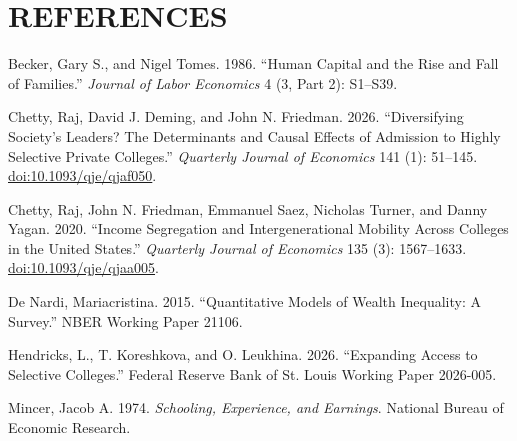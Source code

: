 \documentclass[12pt,letterpaper]{article}
\begin{document}
\section*{REFERENCES}
\begin{list}{}{\setlength{\leftmargin}{0.3in}
              \setlength{\itemindent}{-0.3in}
              \setlength{\itemsep}{0.6\baselineskip}
              \setlength{\parsep}{0pt}}
\item Becker, Gary S., and Nigel Tomes. 1986. ``Human Capital and the Rise and Fall of Families.'' \textit{Journal of Labor Economics} 4 (3, Part 2): S1--S39.
\item Chetty, Raj, David J. Deming, and John N. Friedman. 2026. ``Diversifying Society's Leaders? The Determinants and Causal Effects of Admission to Highly Selective Private Colleges.'' \textit{Quarterly Journal of Economics} 141 (1): 51--145. \href{https://doi.org/10.1093/qje/qjaf050}{doi:10.1093/qje/qjaf050}.
\item Chetty, Raj, John N. Friedman, Emmanuel Saez, Nicholas Turner, and Danny Yagan. 2020. ``Income Segregation and Intergenerational Mobility Across Colleges in the United States.'' \textit{Quarterly Journal of Economics} 135 (3): 1567--1633. \href{https://doi.org/10.1093/qje/qjaa005}{doi:10.1093/qje/qjaa005}.
\item De Nardi, Mariacristina. 2015. ``Quantitative Models of Wealth Inequality: A Survey.'' NBER Working Paper 21106.
\item Hendricks, L., T. Koreshkova, and O. Leukhina. 2026. ``Expanding Access to Selective Colleges.'' Federal Reserve Bank of St. Louis Working Paper 2026-005.
\item Mincer, Jacob A. 1974. \textit{Schooling, Experience, and Earnings}. National Bureau of Economic Research.
\end{list}
\end{document}

